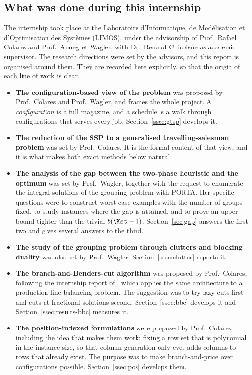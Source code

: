 \subsection{What was done during this internship}\label{ssec:intro-done}

The internship took place at the Laboratoire d'Informatique, de Mod\'elisation et
d'Optimisation des Syst\`emes (LIMOS), under the advisorship of Prof.~Rafael
Colares and Prof.~Annegret Wagler, with Dr.~Renaud Chicoisne as academic
supervisor. The research directions were set by the advisors, and this report is
organised around them. They are recorded here explicitly, so that the origin of
each line of work is clear.

\begin{itemize}[topsep=4pt,itemsep=3pt]
  \item \textbf{The configuration-based view of the problem} was proposed by
  Prof.~Colares and Prof.~Wagler, and frames the whole project. A
  \emph{configuration} is a full magazine, and a schedule is a walk through
  configurations that serves every job. Section~\ref{ssec:gtsp} develops it.

  \item \textbf{The reduction of the SSP to a generalised travelling-salesman
  problem} was set by Prof.~Colares. It is the formal content of that view, and it
  is what makes both exact methods below natural.

  \item \textbf{The analysis of the gap between the two-phase heuristic and the
  optimum} was set by Prof.~Wagler, together with the request to enumerate the
  integral solutions of the grouping problem with PORTA. Her specific questions
  were to construct worst-case examples with the number of groups fixed, to study
  instances where the gap is attained, and to prove an upper bound tighter than the
  trivial $b(\Kst-1)$. Section~\ref{sec:gap} answers the first two and gives
  several answers to the third.

  \item \textbf{The study of the grouping problem through clutters and blocking
  duality} was also set by Prof.~Wagler. Section~\ref{ssec:clutter} reports it.

  \item \textbf{The branch-and-Benders-cut algorithm} was proposed by
  Prof.~Colares, following the internship report of \citet{Kashou2025}, which
  applies the same architecture to a production-line balancing problem. The
  suggestion was to try lazy cuts first and cuts at fractional solutions second.
  Section~\ref{ssec:bbc} develops it and Section~\ref{ssec:results-bbc} measures it.

  \item \textbf{The position-indexed formulations} were proposed by
  Prof.~Colares, including the idea that makes them work: fixing a row set that
  is polynomial in the instance size, so that column generation only ever adds
  columns to rows that already exist. The purpose was to make branch-and-price over
  configurations possible. Section~\ref{ssec:pos} develops them.
\end{itemize}


